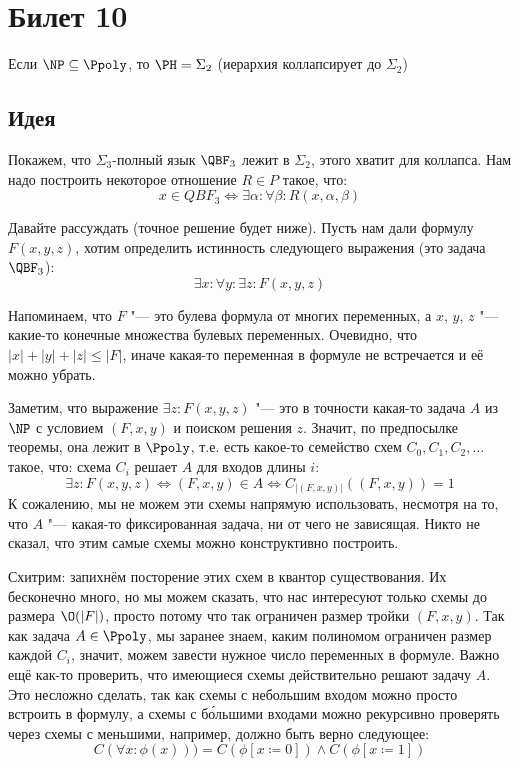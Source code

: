\setcounter{section}{9}
\section{Билет 10}
	\begin{theorem}
		Если $\NP \subseteq \Ppoly$, то $\PH = \Sigma_2$ (иерархия коллапсирует до $\Sigma_2$)
	\end{theorem}

\subsection{Идея}
	Покажем, что $\Sigma_3$-полный язык $\QBF_3$ лежит в $\Sigma_2$, этого хватит для коллапса.
	Нам надо построить некоторое отношение $R \in P$ такое, что:
	\[ x \in QBF_3 \iff \exists \alpha \colon \forall \beta \colon R(x, \alpha, \beta) \]

	Давайте рассуждать (точное решение будет ниже).
	Пусть нам дали формулу $F(x, y, z)$, хотим определить истинность следующего выражения (это задача $\QBF_3$):
	\[ \exists x \colon \forall y \colon \exists z \colon F(x, y, z) \]
	\begin{Rem}
		Напоминаем, что $F$ "--- это булева формула от многих переменных,
		а $x$, $y$, $z$ "--- какие-то конечные множества булевых переменных.
		Очевидно, что $|x|+|y|+|z|\le|F|$, иначе какая-то переменная в формуле не встречается и её можно убрать.
	\end{Rem}
	Заметим, что выражение $\exists z \colon F(x, y, z)$ "--- это в точности какая-то задача $A$ из $\NP$ с условием $(F, x, y)$ и поиском решения $z$.
	Значит, по предпосылке теоремы, она лежит в $\Ppoly$, т.е. есть какое-то семейство схем $C_0, C_1, C_2, \dots$ такое, что:
	схема $C_i$ решает $A$ для входов длины $i$:
	\[
		\exists z \colon F(x, y, z) \iff (F, x, y) \in A \iff C_{|(F, x, y)|}((F, x, y)) = 1
	\]
	К сожалению, мы не можем эти схемы напрямую использовать, несмотря на то, что $A$ "--- какая-то фиксированная задача, ни от чего не зависящая.
	Никто не сказал, что этим самые схемы можно конструктивно построить.

	Схитрим: запихнём посторение этих схем в квантор существования.
	Их бесконечно много, но мы можем сказать, что нас интересуют только схемы до размера $\O(|F|)$, просто потому что так ограничен размер тройки $(F, x, y)$.
	Так как задача $A \in \Ppoly$, мы заранее знаем, каким полиномом ограничен размер каждой $C_i$, значит, можем завести нужное число переменных в формуле.
	Важно ещё как-то проверить, что имеющиеся схемы действительно решают задачу $A$.
	Это несложно сделать, так как схемы с небольшим входом можно просто встроить в формулу,
	а схемы с б\'ольшими входами можно рекурсивно проверять через схемы с меньшими, например,
	должно быть верно следующее:
	\[ C(\forall x \colon \phi(x))) = C(\phi[x \coloneq 0]) \land C(\phi[x \coloneq 1]) \]

